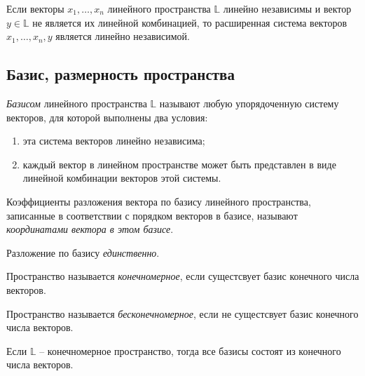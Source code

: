 \begin{property}
    Если векторы $x_1, \ldots, x_n$ линейного пространства $\mathbb{L}$ линейно независимы и вектор $y \in \mathbb{L}$ не является их линейной комбинацией, то расширенная система векторов $x_1, \ldots , x_n, y$ является линейно независимой.
\end{property}

\subsection{Базис, размерность пространства}

\begin{definition}[Базис]
    \textit{Базисом} линейного пространства $\mathbb{L}$ называют любую упорядоченную систему векторов, для которой выполнены два условия:
    \begin{enumerate}
        \item эта система векторов линейно независима;
        \item каждый вектор в линейном пространстве может быть представлен в виде линейной комбинации векторов этой системы.
    \end{enumerate}
\end{definition}

\begin{definition}
    Коэффициенты разложения вектора по базису линейного пространства, записанные в соответствии с порядком векторов в базисе, называют \textit{координатами вектора в этом базисе}.
\end{definition}

\begin{theorem}
    Разложение по базису \textit{единственно}.
\end{theorem}

\begin{definition}
    Пространство называется \textit{конечномерное}, если сущестсвует базис конечного числа векторов.
\end{definition}

\begin{definition}
    Пространство называется \textit{бесконечномерное}, если не сущестсвует базис конечного числа векторов.
\end{definition}

\begin{theorem}
    Если $\mathbb{L}$ -- конечномерное пространство, тогда все базисы состоят из конечного числа векторов.
\end{theorem}

